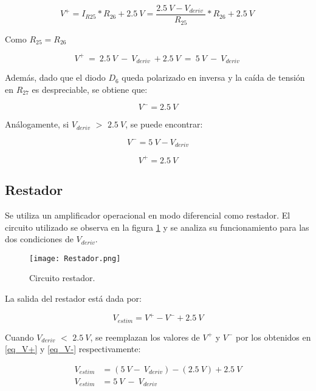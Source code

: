 \begin{equation} 
	V^+=I_{R25}*R_{26}+2.5\:V=\frac{2.5\:V-V_{deriv}\ }{R_{25}}*R_{26}+2.5\:V\ 
\end{equation} 

Como $R_{25}=R_{26}$

\begin{equation} \label{eq_V+}
	V^+\ =\ 2.5\:V\ -\ V_{deriv}\ +2.5\:V\ =\ 5\:V\ -\ V_{deriv}\ 
\end{equation}

Además, dado que el diodo $D_6$ queda polarizado en inversa y la caída de tensión en $R_{27}$ es despreciable, se obtiene que:
 
 \begin{equation} \label{eq_V-}
 	V^- = 2.5\:V 
 \end{equation}

Análogamente, si $V_{deriv}$ $\mathrm{>}$ $2.5\:V$, se puede encontrar:

\begin{equation} \label{eq_V-_2}
	V^- =5\:V-V_{deriv} 
\end{equation}

\begin{equation}  \label{eq_V+_2}
	V^+ = 2.5\:V
\end{equation}


\subsection{Restador}

Se utiliza un amplificador operacional en modo diferencial como restador. El circuito utilizado se observa en la figura \ref{fig:img_Restador} y se analiza su funcionamiento para las dos condiciones de $V_{deriv}$.

\begin{figure}[H]
	\centering
	\texttt{[image: Restador.png]}
	\caption{Circuito restador.}
	\label{fig:img_Restador}
\end{figure}

La salida del restador está dada por:

\begin{equation} \label{eq_salida_restador}
		V_{estim}=V^+-V^-+2.5\:V
\end{equation}

Cuando $V_{deriv}$ $\mathrm{<}$ $2.5\:V$, se reemplazan los valores de $V^+$ y $V^-$ por los obtenidos en \ref{eq_V+} y \ref{eq_V-} respectivamente:

\begin{equation*} 
	\begin{aligned}
		V_{estim}&=(5\:V -\ V_{deriv})-(2.5\: V)+2.5\:V\\
		V_{estim}&=5\: V\ -\ V_{deriv}\\ 
	\end{aligned}
\end{equation*}

